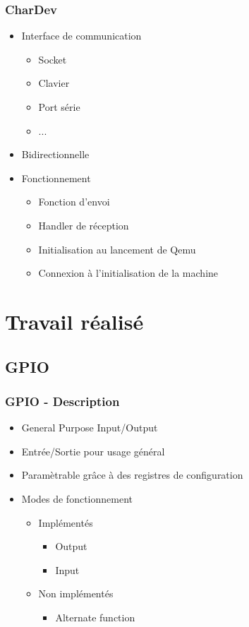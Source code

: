 \documentclass{beamer}
\begin{document}
			\begin{frame}
				\frametitle{CharDev}
				\begin{itemize}
					\item Interface de communication
						\begin{itemize}
							\item Socket
							\item Clavier
							\item Port série
							\item ...
						\end{itemize}
					\item Bidirectionnelle
					\item Fonctionnement
						\begin{itemize}
							\item Fonction d'envoi
							\item Handler de réception
							\item Initialisation au lancement de Qemu
							\item Connexion à l'initialisation de la machine
						\end{itemize}
				\end{itemize}
			\end{frame}
			
			
			
	\section{Travail réalisé}
		\subsection{GPIO}
			\begin{frame}
				\frametitle{GPIO - Description}
				\begin{itemize}
					\item General Purpose Input/Output
					\item Entrée/Sortie pour usage général
					\item Paramètrable grâce à des registres de configuration
					\item Modes de fonctionnement
						\begin{itemize}
							\item Implémentés
								\begin{itemize}
									\item Output
									\item Input
								\end{itemize}
							\item Non implémentés
								\begin{itemize}
									\item Alternate function
								\end{itemize}
						\end{itemize}
				\end{itemize}
			\end{frame}
			
\end{document}
